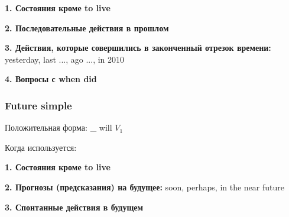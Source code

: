 \documentclass{article}
\begin{document}
\indent \textbf{1. Состояния кроме to live}

\indent \textbf{2. Последовательные действия в прошлом}

\indent \textbf{3. Действия, которые совершились в законченный отрезок времени:} yesterday, last ..., ago ..., in 2010

\indent \textbf{4. Вопросы с when did}

\subsubsection{Future simple}

Положительная форма: \_ will $V_{1}$

\hfill

\noindent Когда используется:

\indent \textbf{1. Состояния кроме to live}

\indent \textbf{2. Прогнозы (предсказания) на будущее:} soon, perhaps, in the near future

\indent \textbf{3. Спонтанные действия в будущем}
\end{document}
